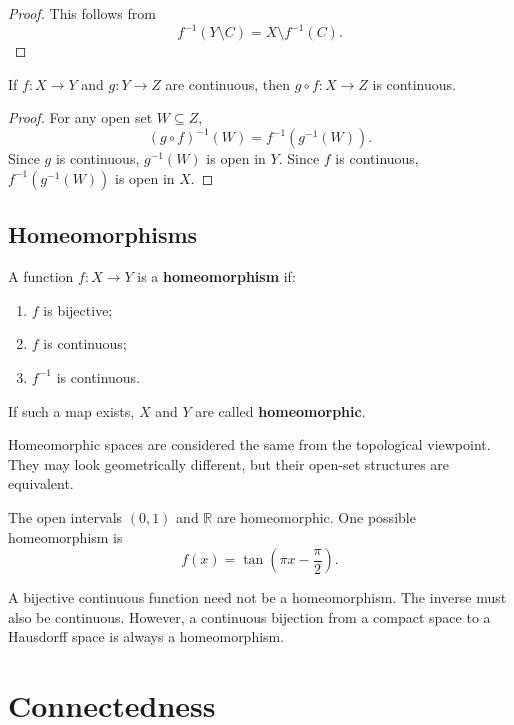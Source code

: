 \begin{proof}
This follows from
\[
    f^{-1}(Y\setminus C)=X\setminus f^{-1}(C).
\]
\end{proof}

\begin{proposition}
If $f:X\to Y$ and $g:Y\to Z$ are continuous, then $g\circ f:X\to Z$ is continuous.
\end{proposition}

\begin{proof}
For any open set $W\subseteq Z$,
\[
    (g\circ f)^{-1}(W)=f^{-1}(g^{-1}(W)).
\]
Since $g$ is continuous, $g^{-1}(W)$ is open in $Y$. Since $f$ is continuous, $f^{-1}(g^{-1}(W))$ is open in $X$.
\end{proof}

\subsection{Homeomorphisms}

\begin{definition}[Homeomorphism]
A function $f:X\to Y$ is a \textbf{homeomorphism} if:
\begin{enumerate}
    \item $f$ is bijective;
    \item $f$ is continuous;
    \item $f^{-1}$ is continuous.
\end{enumerate}
If such a map exists, $X$ and $Y$ are called \textbf{homeomorphic}.
\end{definition}

Homeomorphic spaces are considered the same from the topological viewpoint. They may look geometrically different, but their open-set structures are equivalent.

\begin{example}
The open intervals $(0,1)$ and $\mathbb{R}$ are homeomorphic. One possible homeomorphism is
\[
    f(x)=\tan\left(\pi x-\frac{\pi}{2}\right).
\]
\end{example}

\begin{remark}
A bijective continuous function need not be a homeomorphism. The inverse must also be continuous. However, a continuous bijection from a compact space to a Hausdorff space is always a homeomorphism.
\end{remark}

\section{Connectedness}


